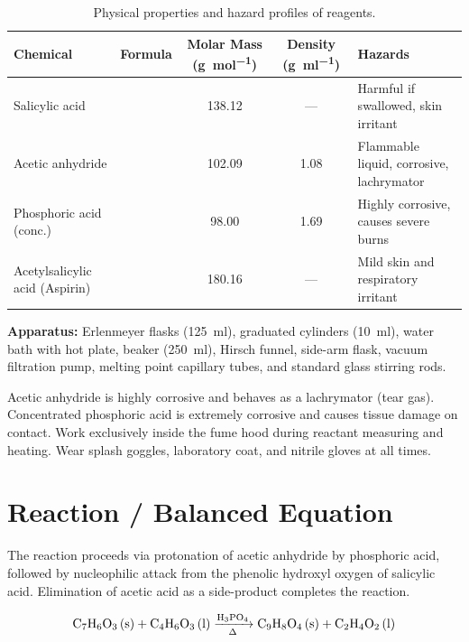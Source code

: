 \documentclass[11pt,a4paper]{article}
\begin{document}
\begin{table}[h]
\centering
\sffamily\small
\caption{Physical properties and hazard profiles of reagents.}
\label{tab:chemicals}
\vspace{0.5em}
\small
\begin{tabularx}{\linewidth}{>{\raggedright\arraybackslash}X l S[table-format=3.2] S[table-format=1.2] >{\raggedright\arraybackslash}X}
\toprule
\textbf{Chemical} & \textbf{Formula} & {\textbf{Molar Mass (\unit{\gram\per\mole})}} & {\textbf{Density (\unit{\gram\per\milli\litre})}} & \textbf{Hazards} \\
\midrule
Salicylic acid &  & 138.12 & {---} & Harmful if swallowed, skin irritant \\
Acetic anhydride &  & 102.09 & 1.08 & Flammable liquid, corrosive, lachrymator \\
Phosphoric acid (conc.) &  & 98.00 & 1.69 & Highly corrosive, causes severe burns \\
Acetylsalicylic acid (Aspirin) &  & 180.16 & {---} & Mild skin and respiratory irritant \\
\bottomrule
\end{tabularx}
\end{table}

\textbf{Apparatus:} Erlenmeyer flasks (\qty{125}{\milli\litre}), graduated cylinders (\qty{10}{\milli\litre}), water bath with hot plate, beaker (\qty{250}{\milli\litre}), Hirsch funnel, side-arm flask, vacuum filtration pump, melting point capillary tubes, and standard glass stirring rods.

\begin{safetybox}
Acetic anhydride is highly corrosive and behaves as a lachrymator (tear gas). Concentrated phosphoric acid is extremely corrosive and causes tissue damage on contact. Work exclusively inside the fume hood during reactant measuring and heating. Wear splash goggles, laboratory coat, and nitrile gloves at all times.
\end{safetybox}

\section{Reaction / Balanced Equation}
The reaction proceeds via protonation of acetic anhydride by phosphoric acid, followed by nucleophilic attack from the phenolic hydroxyl oxygen of salicylic acid. Elimination of acetic acid as a side-product completes the reaction.

\begin{equation}
\ce{C7H6O3 (s) + C4H6O3 (l) ->[H3PO4][\Delta] C9H8O4 (s) + C2H4O2 (l)}
\end{equation}
\end{document}
